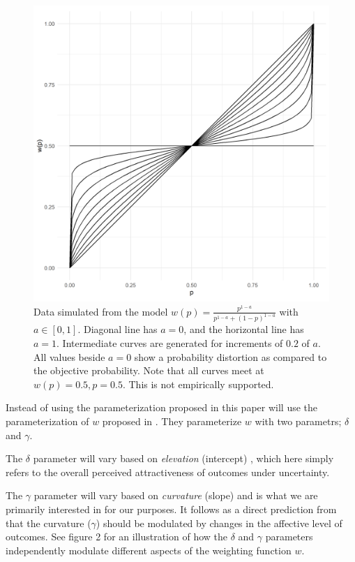 \documentclass[12pt]{article}
\begin{document}
\begin{figure}[h!]
	\includegraphics[width = \linewidth]{../Figures/oneParam.png}
	\caption{Data simulated from the model
		$w(p) = \frac{p^{1-a}}
		{p^{1-a}+(1-p)^{1-a}}$ with
		$a \in [0, 1]$. Diagonal line has
		$a = 0$, and the horizontal line
		has $a = 1$. Intermediate curves
		are generated for increments of $0.2$
		of $a$. All values beside
		$a = 0$ show a probability distortion
		as compared to the objective probability.
		Note that all curves meet at
		$w(p) = 0.5, p = 0.5$. This is
	not empirically supported.}
\end{figure}

Instead of using the parameterization
proposed in \textcite{rottenstreich2001money}
this paper will use the parameterization
of $w$ proposed in \textcite{gonzalez1999shape}.
They parameterize $w$ with two parametrs;
$\delta$ and $\gamma$.

\vspace{3mm}

The $\delta$ parameter will vary based on
\emph{elevation} (intercept)
\autocite{gonzalez1999shape},
which here simply refers to the overall
perceived attractiveness of outcomes
under uncertainty.

\vspace{3mm}

The $\gamma$ parameter will vary based on
\emph{curvature} (slope)
\autocite{gonzalez1999shape} and is what we
are primarily interested in for our purposes.
It follows as a direct prediction from
\textcite{rottenstreich2001money} that the
curvature ($\gamma$) should be modulated by changes in
the affective level of outcomes. See
figure 2 for an illustration of how the $\delta$
and $\gamma$ parameters independently modulate
different aspects of the weighting function $w$.
\end{document}
